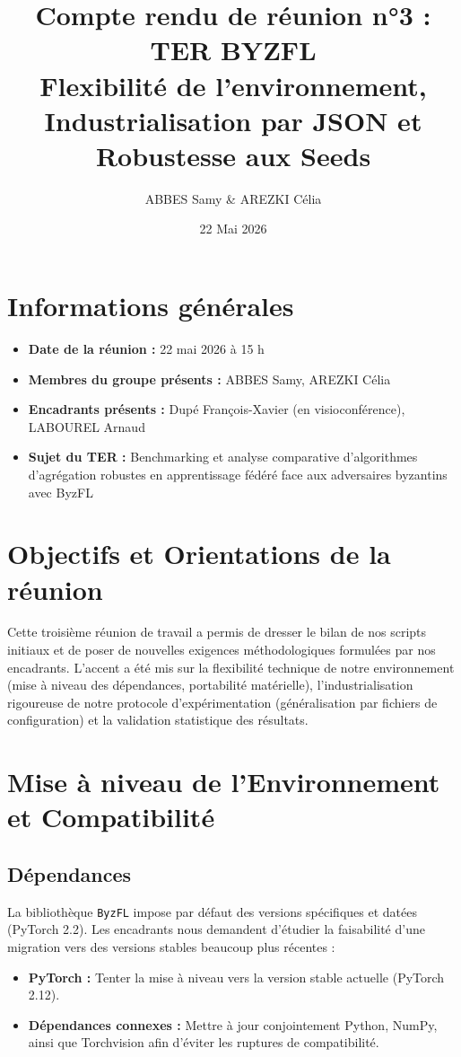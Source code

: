 \documentclass[11pt, a4paper]{article}
\title{\textbf{Compte rendu de réunion n°3 : TER BYZFL} \\ \large Flexibilité de l'environnement, Industrialisation par JSON et Robustesse aux Seeds}
\author{ABBES Samy \& AREZKI Célia}
\date{22 Mai 2026}
\begin{document}
\maketitle

\section*{Informations générales}
\begin{itemize}
    \item \textbf{Date de la réunion :} 22 mai 2026 à 15 h
    \item \textbf{Membres du groupe présents :} ABBES Samy, AREZKI Célia
    \item \textbf{Encadrants présents :} Dupé François-Xavier (en visioconférence), LABOUREL Arnaud
    \item \textbf{Sujet du TER :} Benchmarking et analyse comparative d'algorithmes d'agrégation robustes en apprentissage fédéré face aux adversaires byzantins avec ByzFL
\end{itemize}

\section{Objectifs et Orientations de la réunion}
Cette troisième réunion de travail a permis de dresser le bilan de nos scripts initiaux et de poser de nouvelles exigences méthodologiques formulées par nos encadrants. L'accent a été mis sur la flexibilité technique de notre environnement (mise à niveau des dépendances, portabilité matérielle), l'industrialisation rigoureuse de notre protocole d'expérimentation (généralisation par fichiers de configuration) et la validation statistique des résultats.

\section{Mise à niveau de l'Environnement et Compatibilité}

\subsection{Dépendances} %
La bibliothèque \texttt{ByzFL} impose par défaut des versions spécifiques et datées (PyTorch 2.2). Les encadrants nous demandent d'étudier la faisabilité d'une migration vers des versions stables beaucoup plus récentes :
\begin{itemize}
    \item \textbf{PyTorch :} Tenter la mise à niveau vers la version stable actuelle (PyTorch 2.12).
    \item \textbf{Dépendances connexes :} Mettre à jour conjointement Python, NumPy, ainsi que Torchvision afin d'éviter les ruptures de compatibilité.
\end{itemize}
\end{document}
